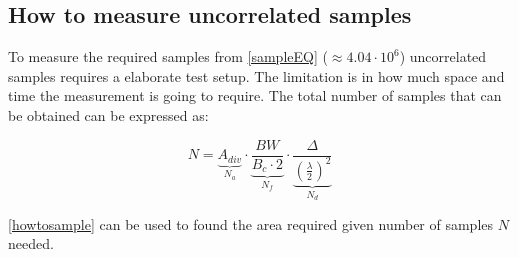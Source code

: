 \subsection{How to measure uncorrelated samples}
\label{howtomeasureUS}
To measure the required samples from \autoref{sampleEQ} ($\approx 4.04\cdot10^6$) uncorrelated samples requires a elaborate test setup. The limitation is in how much space and time the measurement is going to require. The total number of samples that can be obtained can be expressed as: 


\begin{equation}
N = \underbrace{A_{div}}_\text{$N_a$} \cdot \underbrace{\frac{BW}{B_c \cdot 2}}_\text{$N_f$} \cdot \underbrace{\frac{\Delta}{(\frac{\lambda}{2})^2}}_\text{$N_d$}
\label{howtosample}
\end{equation} 
 
\begin{where}
\end{where} 
 

\autoref{howtosample} can be used to found the area required given number of samples $N$ needed.

